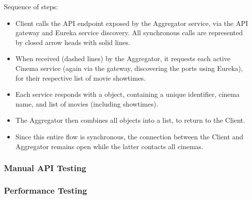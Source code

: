 Sequence of steps:
\begin{itemize}
	\item Client calls the API endpoint  exposed by the Aggregator service, via the API gateway and Eureka service discovery. All synchronous calls are represented by closed arrow heads with solid lines.
	\item When received (dashed lines) by the Aggregator, it requests each active Cinema service (again via the gateway, discovering the ports using Eureka), for their respective list of movie showtimes.
	\item Each service responds with a  object, containing a unique identifier, cinema name, and list of movies (including showtimes).
	\item The Aggregator then combines all  objects into a list, to return to the Client.
	\item Since this entire flow is synchronous, the connection between the Client and Aggregator remains open while the latter contacts all cinemas.
\end{itemize}

\subsubsection{Manual API Testing}
\subsubsection{Performance Testing}
